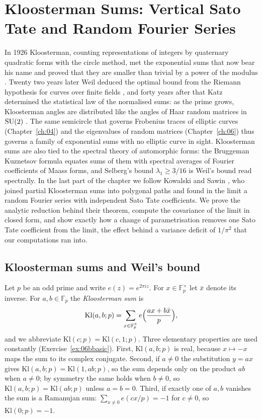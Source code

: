 \chapter{Kloosterman Sums: Vertical Sato Tate and Random Fourier Series}\label{ch:06b}

In 1926 Kloosterman, counting representations of integers by quaternary quadratic forms with the circle method, met the exponential sums that now bear his name and proved that they are smaller than trivial by a power of the modulus \cite{kloosterman1926}. Twenty two years later Weil deduced the optimal bound from the Riemann hypothesis for curves over finite fields \cite{weil1948b}, and forty years after that Katz determined the statistical law of the normalised sums: as the prime grows, Kloosterman angles are distributed like the angles of Haar random matrices in $\mathrm{SU}(2)$ \cite{katz1988}. The same semicircle that governs Frobenius traces of elliptic curves (Chapter~\ref{ch:04}) and the eigenvalues of random matrices (Chapter~\ref{ch:06}) thus governs a family of exponential sums with no elliptic curve in sight. Kloosterman sums are also tied to the spectral theory of automorphic forms: the Bruggeman Kuznetsov formula equates sums of them with spectral averages of Fourier coefficients of Maass forms, and Selberg's bound $\lambda_1\ge 3/16$ is Weil's bound read spectrally. In the last part of the chapter we follow Kowalski and Sawin \cite{kowalskisawin2016}, who joined partial Kloosterman sums into polygonal paths and found in the limit a random Fourier series with independent Sato Tate coefficients. We prove the analytic reduction behind their theorem, compute the covariance of the limit in closed form, and show exactly how a change of parametrisation removes one Sato Tate coefficient from the limit, the effect behind a variance deficit of $1/\pi^2$ that our computations ran into.

\section{Kloosterman sums and Weil's bound}\label{sec:06bweil}

Let $p$ be an odd prime and write $e(z)=e^{2\pi iz}$. For $x\in\mathbb{F}_p^\times$ let $\bar x$ denote its inverse. For $a,b\in\mathbb{F}_p$ the \emph{Kloosterman sum} is
\[
\mathrm{Kl}(a,b;p)=\sum_{x\in\mathbb{F}_p^\times}e\Bigl(\frac{ax+b\bar x}{p}\Bigr),
\]
and we abbreviate $\mathrm{Kl}(c;p)=\mathrm{Kl}(c,1;p)$. Three elementary properties are used constantly (Exercise~\ref{ex:06bbasic}). First, $\mathrm{Kl}(a,b;p)$ is real, because $x\mapsto -x$ maps the sum to its complex conjugate. Second, if $a\ne0$ the substitution $y=ax$ gives $\mathrm{Kl}(a,b;p)=\mathrm{Kl}(1,ab;p)$, so the sum depends only on the product $ab$ when $a\neq 0$; by symmetry the same holds when $b\ne0$, so $\mathrm{Kl}(a,b;p)=\mathrm{Kl}(ab;p)$ unless $a=b=0$. Third, if exactly one of $a,b$ vanishes the sum is a Ramanujan sum: $\sum_{x\neq0}e(cx/p)=-1$ for $c\ne0$, so $\mathrm{Kl}(0;p)=-1$.

